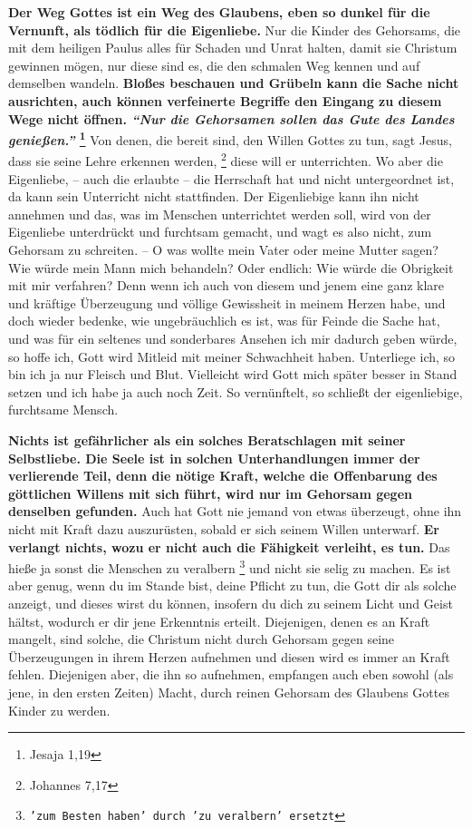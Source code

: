 \textbf{Der Weg Gottes ist ein Weg des Glaubens, eben so dunkel für die
Vernunft,  als
tödlich für die Eigenliebe.} Nur die Kinder des Gehorsams,  die mit dem heiligen
Paulus alles für Schaden und Unrat halten, damit sie Christum gewinnen mögen,
nur diese sind es, die den schmalen Weg kennen und auf demselben wandeln.
\textbf{Bloßes
beschauen und Grübeln kann die Sache nicht ausrichten, auch können verfeinerte
Begriffe den Eingang zu diesem Wege nicht öffnen.
\textit{"`Nur die Gehorsamen sollen das Gute des Landes genießen."'}
\footnote{Jesaja 1,19}}
Von denen, die bereit sind,
den Willen Gottes zu tun, sagt Jesus, dass sie seine Lehre erkennen
werden,
\footnote{Johannes 7,17}
diese will er unterrichten. Wo aber die Eigenliebe,
-- auch die erlaubte -- die Herrschaft hat und nicht untergeordnet ist, da kann
sein Unterricht nicht stattfinden. Der Eigenliebige kann ihn nicht annehmen und
das, was im Menschen unterrichtet werden soll, wird von der Eigenliebe
unterdrückt und furchtsam gemacht, und wagt es also nicht, zum Gehorsam zu
schreiten. -- O was wollte mein Vater oder meine Mutter sagen? Wie würde mein
Mann mich behandeln? Oder endlich: Wie würde die Obrigkeit mit mir verfahren?
Denn wenn ich auch von diesem und jenem eine ganz klare und kräftige
Überzeugung und völlige Gewissheit in meinem Herzen habe, und doch wieder
bedenke, wie ungebräuchlich es ist, was für Feinde die Sache hat, und was für
ein seltenes und sonderbares Ansehen ich mir dadurch geben würde, so hoffe ich,
Gott wird Mitleid mit meiner Schwachheit haben. Unterliege ich, so bin ich ja
nur Fleisch und Blut. Vielleicht wird Gott mich später besser in Stand
setzen und ich habe ja auch noch Zeit. So vernünftelt, so schließt der
eigenliebige, furchtsame Mensch.

\medskip

\textbf{Nichts ist gefährlicher als ein solches Beratschlagen mit seiner Selbstliebe.
Die Seele ist in solchen Unterhandlungen immer der verlierende Teil,
denn die
nötige Kraft, welche die Offenbarung des göttlichen Willens mit sich führt,
wird nur im Gehorsam gegen denselben gefunden.} Auch hat Gott nie jemand von
etwas überzeugt, ohne ihn nicht mit Kraft dazu auszurüsten, sobald er sich
seinem Willen unterwarf. \textbf{Er verlangt nichts, wozu er nicht auch die
Fähigkeit
verleiht, es tun.} Das hieße ja sonst die Menschen zu veralbern \footnote{\texttt{'zum Besten haben' durch 'zu veralbern' ersetzt}} und nicht sie
selig zu machen. Es ist aber genug, wenn du im Stande bist, deine Pflicht zu
tun, die Gott dir als solche anzeigt, und dieses wirst du können, insofern du
dich zu seinem Licht und Geist hältst, wodurch er dir jene Erkenntnis
erteilt. Diejenigen, denen es an Kraft mangelt, sind solche, die Christum nicht
durch Gehorsam gegen seine Überzeugungen in ihrem Herzen aufnehmen und diesen
wird es immer an Kraft fehlen. Diejenigen aber, die ihn so aufnehmen, empfangen
auch eben sowohl (als jene, in den ersten Zeiten) Macht, durch reinen Gehorsam
des Glaubens Gottes Kinder zu werden.

